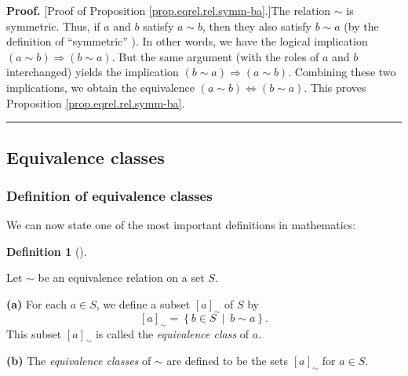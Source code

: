 \documentclass[numbers=enddot,12pt,final,onecolumn,notitlepage]{scrartcl}%
\numberwithin{exer}{subsection}
\theoremstyle{definition}
\newtheorem{defi}[theo]{Definition}
\newenvironment{definition}[1][]
{\begin{defi}[#1]\begin{leftbar}}
{\end{leftbar}\end{defi}}
\newenvironment{proof}[1][Proof]{\noindent\textbf{#1.} }{\ \rule{0.5em}{0.5em}}
\begin{document}
\begin{proof}
[Proof of Proposition \ref{prop.eqrel.rel.symm-ba}.]The relation $\sim$ is
symmetric. Thus, if $a$ and $b$ satisfy $a\sim b$, then they also satisfy
$b\sim a$ (by the definition of \textquotedblleft symmetric\textquotedblright%
). In other words, we have the logical implication $\left(  a\sim b\right)
\Longrightarrow\left(  b\sim a\right)  $. But the same argument (with the
roles of $a$ and $b$ interchanged) yields the implication $\left(  b\sim
a\right)  \Longrightarrow\left(  a\sim b\right)  $. Combining these two
implications, we obtain the equivalence $\left(  a\sim b\right)
\Longleftrightarrow\left(  b\sim a\right)  $. This proves Proposition
\ref{prop.eqrel.rel.symm-ba}.
\end{proof}

\subsection{Equivalence classes}

\subsubsection{Definition of equivalence classes}

We can now state one of the most important definitions in mathematics:

\begin{definition}
\label{def.eqrel.eqcl.eqcl}Let $\sim$ be an equivalence relation on a set $S$.

\textbf{(a)} For each $a\in S$, we define a subset $\left[  a\right]  _{\sim}$
of $S$ by%
\begin{equation}
\left[  a\right]  _{\sim}=\left\{  b\in S\ \mid\ b\sim a\right\}  .
\label{eq.def.eqrel.eqcl.eqcl.a.eq}%
\end{equation}
This subset $\left[  a\right]  _{\sim}$ is called the \textit{equivalence
class} of $a$.

\textbf{(b)} The \textit{equivalence classes} of $\sim$ are defined to be the
sets $\left[  a\right]  _{\sim}$ for $a\in S$.
\end{definition}
\end{document}
